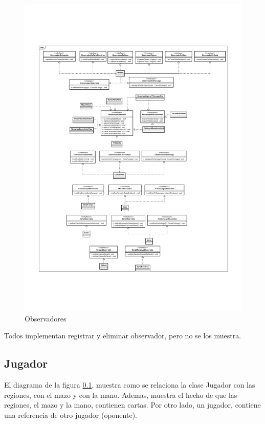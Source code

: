 \begin{figure}[H]
	\centering
	\includegraphics[scale=0.8]{includes/class_Observadores}
	\caption{Observadores}
	\label{class_Observadores}
\end{figure}

Todos implementan registrar y eliminar observador, pero no se los muestra.

\subsection{Jugador}

El diagrama de la figura \ref{}, muestra como se relaciona la clase Jugador con las regiones, con el mazo y con la mano. Ademas, muestra el hecho de que las regiones, el mazo y la mano, contienen cartas. Por otro lado, un jugador, contiene una referencia de otro jugador (oponente).

